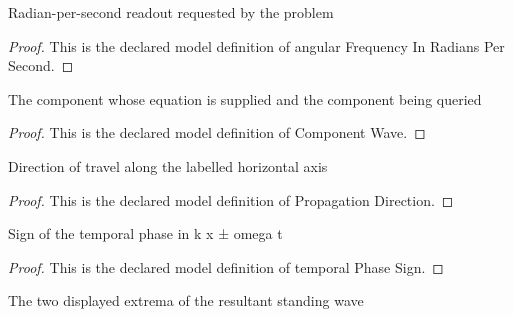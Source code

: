 \begin{definition}
  \label{def:physics:phyx-mini-0297:phyxminiproblems-problemphyxmini0297-angularfrequencyinradianspersecond}
  Radian-per-second readout requested by the problem
\end{definition}
\begin{proof}
  This is the declared model definition of angular Frequency In Radians Per Second.
\end{proof}
\begin{definition}
  \label{def:physics:phyx-mini-0297:phyxminiproblems-problemphyxmini0297-componentwave}
  The component whose equation is supplied and the component being queried
\end{definition}
\begin{proof}
  This is the declared model definition of Component Wave.
\end{proof}
\begin{definition}
  \label{def:physics:phyx-mini-0297:phyxminiproblems-problemphyxmini0297-propagationdirection}
  Direction of travel along the labelled horizontal axis
\end{definition}
\begin{proof}
  This is the declared model definition of Propagation Direction.
\end{proof}
\begin{definition}
  \label{def:physics:phyx-mini-0297:phyxminiproblems-problemphyxmini0297-temporalphasesign}
  Sign of the temporal phase in k x ± omega t
\end{definition}
\begin{proof}
  This is the declared model definition of temporal Phase Sign.
\end{proof}
\begin{definition}[Snapshot]
  \label{def:physics:phyx-mini-0297:phyxminiproblems-problemphyxmini0297-snapshot}
  The two displayed extrema of the resultant standing wave
\end{definition}
